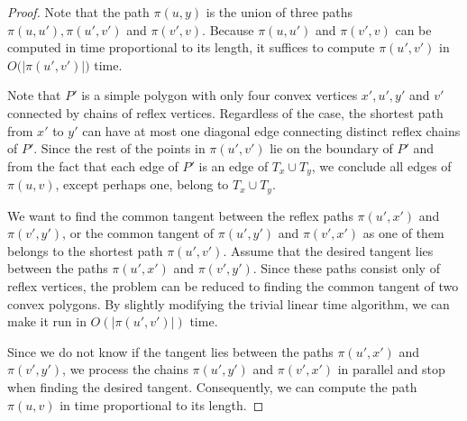 \documentclass[a4paper,UKenglish]{lipics}
\newcommand{\p}[2]{\ensuremath{\pi(#1, #2)}}
\begin{document}
\begin{proof}
Note that the path $\p{u}{y}$ is the union of three paths $\p{u}{u'}, \p{u'}{v'}$ and $\p{v'}{v}$.
Because $\p{u}{u'}$ and  $\p{v'}{v}$ can be computed in time proportional to its length, it suffices to compute $\p{u'}{v'}$ in $O(|$\p{u'}{v'}$|)$ time.

Note that $P'$ is a simple polygon with only four convex vertices $x',u', y'$ and $v'$ connected by chains of reflex vertices. 
Regardless of the case, the shortest path from $x'$ to $y'$ can have at most one diagonal edge connecting distinct reflex chains of $P'$. Since the rest of the points in $\p{u'}{v'}$ lie on the boundary of $P'$ and from the fact that each edge of $P'$ is an edge of $T_x\cup T_y$, we conclude all edges of $\p{u}{v}$, except perhaps one, belong to $T_x\cup T_y$.

We want to find the common tangent between the reflex paths $\p{u'}{x'}$ and $\p{v'}{y'}$, or the common tangent of $\p{u'}{y'}$ and $\p{v'}{x'}$ as one of them belongs to the shortest path $\p{u'}{v'}$.
Assume that the desired tangent lies between the paths $\p{u'}{x'}$ and $\p{v'}{y'}$. 
Since these paths consist only of reflex vertices, the problem can be reduced to finding the common tangent of two convex polygons. By slightly modifying the trivial linear time algorithm, we can make it run in $O(|\p{u'}{v'}|)$ time. 

Since we do not know if the tangent lies between the paths $\p{u'}{x'}$ and $\p{v'}{y'}$, we process the chains $\p{u'}{y'}$ and $\p{v'}{x'}$ in parallel and stop when finding the desired tangent. Consequently, we can compute the path $\p{u}{v}$ in time proportional to its length. 
\end{proof}
\end{document}
